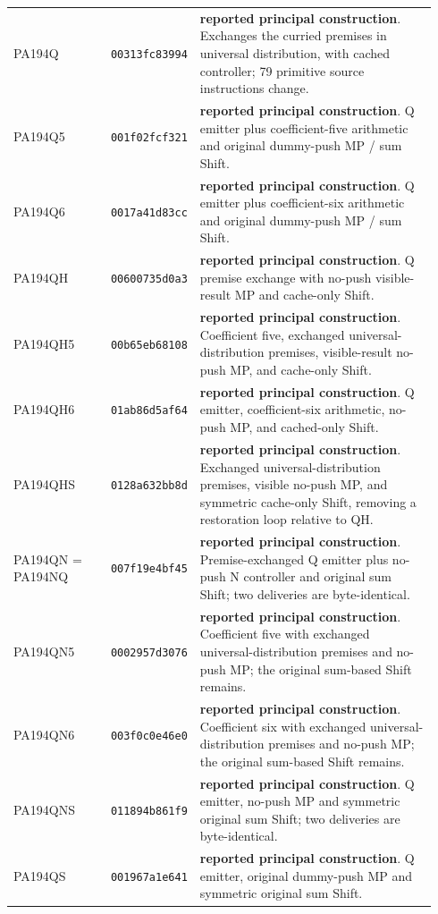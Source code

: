 {\begin{longtable}{@{}>{\raggedright\arraybackslash}p{0.23\linewidth}>{\raggedright\arraybackslash}p{0.145\linewidth}>{\raggedright\arraybackslash}p{0.56\linewidth}@{}}
PA194Q & \texttt{00313fc83994} & \textbf{reported principal construction}. Exchanges the curried premises in universal distribution, with cached controller; 79 primitive source instructions change.\\[4pt]
PA194Q5 & \texttt{001f02fcf321} & \textbf{reported principal construction}. Q emitter plus coefficient-five arithmetic and original dummy-push MP / sum Shift.\\[4pt]
PA194Q6 & \texttt{0017a41d83cc} & \textbf{reported principal construction}. Q emitter plus coefficient-six arithmetic and original dummy-push MP / sum Shift.\\[4pt]
PA194QH & \texttt{00600735d0a3} & \textbf{reported principal construction}. Q premise exchange with no-push visible-result MP and cache-only Shift.\\[4pt]
PA194QH5 & \texttt{00b65eb68108} & \textbf{reported principal construction}. Coefficient five, exchanged universal-distribution premises, visible-result no-push MP, and cache-only Shift.\\[4pt]
PA194QH6 & \texttt{01ab86d5af64} & \textbf{reported principal construction}. Q emitter, coefficient-six arithmetic, no-push MP, and cached-only Shift.\\[4pt]
PA194QHS & \texttt{0128a632bb8d} & \textbf{reported principal construction}. Exchanged universal-distribution premises, visible no-push MP, and symmetric cache-only Shift, removing a restoration loop relative to QH.\\[4pt]
PA194QN = PA194NQ & \texttt{007f19e4bf45} & \textbf{reported principal construction}. Premise-exchanged Q emitter plus no-push N controller and original sum Shift; two deliveries are byte-identical.\\[4pt]
PA194QN5 & \texttt{0002957d3076} & \textbf{reported principal construction}. Coefficient five with exchanged universal-distribution premises and no-push MP; the original sum-based Shift remains.\\[4pt]
PA194QN6 & \texttt{003f0c0e46e0} & \textbf{reported principal construction}. Coefficient six with exchanged universal-distribution premises and no-push MP; the original sum-based Shift remains.\\[4pt]
PA194QNS & \texttt{011894b861f9} & \textbf{reported principal construction}. Q emitter, no-push MP and symmetric original sum Shift; two deliveries are byte-identical.\\[4pt]
PA194QS & \texttt{001967a1e641} & \textbf{reported principal construction}. Q emitter, original dummy-push MP and symmetric original sum Shift.\\[4pt]

\end{longtable}}
